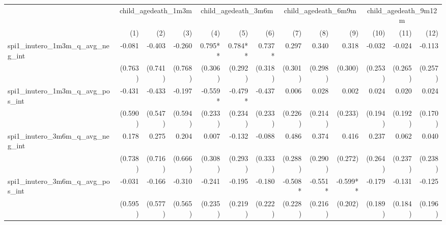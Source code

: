 \begin{tabular}{lrrrrrrrrrrrr}
\toprule
                                            &  \multicolumn{3}{c}{child\_agedeath\_1m3m} &  \multicolumn{3}{c}{child\_agedeath\_3m6m} &  \multicolumn{3}{c}{child\_agedeath\_6m9m} & \multicolumn{3}{c}{child\_agedeath\_9m12m} \\ 
\cmidrule(lr){2-4} \cmidrule(lr){5-7} \cmidrule(lr){8-10} \cmidrule(lr){11-13} 
                                            &          (1) &          (2) &          (3) &          (4) &          (5) &          (6) &          (7) &          (8) &          (9) &         (10) &         (11) &         (12) \\ 
\midrule
spi1\_inutero\_1m3m\_q\_avg\_neg\_int       &       -0.081 &       -0.403 &       -0.260 &      0.795** &      0.784** &       0.737* &        0.297 &        0.340 &        0.318 &       -0.032 &       -0.024 &       -0.113 \\ 
                                            &      (0.763) &      (0.741) &      (0.768) &      (0.306) &      (0.292) &      (0.318) &      (0.301) &      (0.298) &      (0.300) &      (0.253) &      (0.265) &      (0.257) \\ 
spi1\_inutero\_1m3m\_q\_avg\_pos\_int       &       -0.431 &       -0.433 &       -0.197 &      -0.559* &      -0.479* &       -0.437 &        0.006 &        0.028 &        0.002 &        0.024 &        0.020 &        0.024 \\ 
                                            &      (0.590) &      (0.547) &      (0.594) &      (0.233) &      (0.234) &      (0.233) &      (0.226) &      (0.214) &      (0.233) &      (0.194) &      (0.192) &      (0.170) \\ 
spi1\_inutero\_3m6m\_q\_avg\_neg\_int       &        0.178 &        0.275 &        0.204 &        0.007 &       -0.132 &       -0.088 &        0.486 &        0.374 &        0.416 &        0.237 &        0.062 &        0.040 \\ 
                                            &      (0.738) &      (0.716) &      (0.666) &      (0.308) &      (0.293) &      (0.333) &      (0.288) &      (0.290) &      (0.272) &      (0.264) &      (0.237) &      (0.238) \\ 
spi1\_inutero\_3m6m\_q\_avg\_pos\_int       &       -0.031 &       -0.166 &       -0.310 &       -0.241 &       -0.195 &       -0.180 &      -0.508* &      -0.551* &     -0.599** &       -0.179 &       -0.131 &       -0.125 \\ 
                                            &      (0.595) &      (0.577) &      (0.565) &      (0.235) &      (0.219) &      (0.222) &      (0.228) &      (0.216) &      (0.202) &      (0.189) &      (0.184) &      (0.196) \\ 

\end{tabular}
